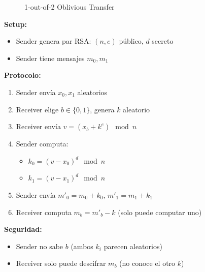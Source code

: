 \documentclass[11pt,a4paper,twoside]{book}
\theoremstyle{definition}
\theoremstyle{remark}
\begin{document}
\begin{figure}[htbp]
\centering
{}
\caption{1-out-of-2 Oblivious Transfer}
\label{fig:ot-basic}
\end{figure}

\begin{mathnote}
\textbf{Setup:}
\begin{itemize}
    \item Sender genera par RSA: $(n, e)$ público, $d$ secreto
    \item Sender tiene mensajes $m_0, m_1$
\end{itemize}

\textbf{Protocolo:}
\begin{enumerate}
    \item Sender envía $x_0, x_1$ aleatorios
    \item Receiver elige $b \in \{0, 1\}$, genera $k$ aleatorio
    \item Receiver envía $v = (x_b + k^e) \mod n$
    \item Sender computa:
    \begin{itemize}
        \item $k_0 = (v - x_0)^d \mod n$
        \item $k_1 = (v - x_1)^d \mod n$
    \end{itemize}
    \item Sender envía $m'_0 = m_0 + k_0$, $m'_1 = m_1 + k_1$
    \item Receiver computa $m_b = m'_b - k$ (solo puede computar uno)
\end{enumerate}

\textbf{Seguridad:}
\begin{itemize}
    \item Sender no sabe $b$ (ambos $k_i$ parecen aleatorios)
    \item Receiver solo puede descifrar $m_b$ (no conoce el otro $k$)
\end{itemize}
\end{mathnote}
\end{document}
